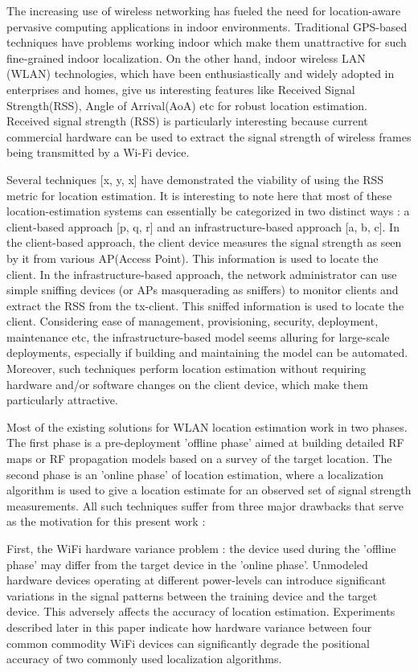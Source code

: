 \documentclass{Localization-PaperWriteupDraft}
\begin{document}
The increasing use of wireless networking has fueled the need for location-aware pervasive computing applications in indoor environments. Traditional GPS-based techniques have problems working indoor which make them unattractive for such fine-grained indoor localization. On the other hand, indoor wireless LAN (WLAN) technologies, which have been enthusiastically and widely adopted in enterprises and homes, give us interesting features like Received Signal Strength(RSS), Angle of Arrival(AoA) etc for robust location estimation. Received signal strength (RSS) is particularly interesting because current commercial hardware can be used to extract the signal strength of wireless frames being transmitted by a Wi-Fi device. 

Several techniques [x, y, x] have demonstrated the viability of using the RSS metric for location estimation.   It is interesting to note here that most of these location-estimation systems can essentially be categorized in two distinct ways : a client-based approach [p, q, r] and an infrastructure-based approach [a, b, c]. In the client-based approach, the client device measures the signal strength as seen by it from various AP(Access Point). This information is used to locate the client. In the infrastructure-based approach, the network administrator can use simple sniffing devices (or APs masquerading as sniffers) to monitor clients and extract the RSS from the tx-client.  This sniffed information is used to locate the client. Considering ease of management, provisioning, security, deployment,  maintenance etc, the infrastructure-based model seems alluring for large-scale deployments, especially if building and maintaining the model can be automated. Moreover, such techniques perform location estimation without requiring hardware and/or software changes on the client device, which make them particularly attractive.

Most of the existing solutions for WLAN location estimation work in two phases. The first phase is a pre-deployment 'offline phase' aimed at building detailed RF maps or RF propagation models based on a survey of the target location. The second phase is an 'online phase' of location estimation, where a localization algorithm is used to give a location estimate for an observed set of signal strength measurements. All such techniques suffer from three major drawbacks that serve as the motivation for this present work :

First, the WiFi hardware variance problem : the device used during the 'offline phase' may differ from the target device in the 'online phase'. Unmodeled hardware devices operating at different power-levels can introduce significant variations in the signal patterns between the training device and the target device. This adversely affects the accuracy of location estimation. Experiments described later in this paper indicate how hardware variance between four common commodity WiFi devices can significantly degrade the positional accuracy of two commonly used localization algorithms. 
\end{document}
